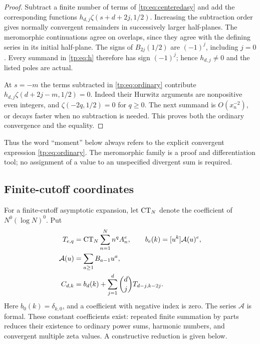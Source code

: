 \begin{proof}
Subtract a finite number of terms of \eqref{tp:eq:centeredasy} and add
the corresponding functions $h_{d,j}\zeta(s+d+2j,1/2)$.  Increasing
the subtraction order gives normally convergent remainders in
successively larger half-planes.  The meromorphic continuations agree
on overlaps, since they agree with the defining series in its initial
half-plane.  The signs of $B_{2j}(1/2)$ are $(-1)^j$, including $j=0$.
Every summand in \eqref{tp:eq:h} therefore has sign $(-1)^j$; hence
$h_{d,j}\ne0$ and the listed poles are actual.

At $s=-m$ the terms subtracted in \eqref{tp:eq:ordinary} contribute
$h_{d,j}\zeta(d+2j-m,1/2)=0$.  Indeed their Hurwitz arguments are
nonpositive even integers, and $\zeta(-2q,1/2)=0$ for $q\geq0$.
The next summand is $O(x_n^{-2})$, or decays faster when no subtraction
is needed.  This proves both the ordinary convergence and the equality.
\end{proof}

Thus the word ``moment'' below always refers to the explicit convergent
expression \eqref{tp:eq:ordinary}.  The meromorphic family is a proof
and differentiation tool; no assignment of a value to an unspecified
divergent sum is required.

\subsection{Finite-cutoff coordinates}

For a finite-cutoff asymptotic expansion, let $\operatorname{CT}_N$ denote the coefficient
of $N^0(\log N)^0$.  Put
\begin{equation}\label{tp:eq:TC}
 \begin{split}
 T_{e,q}&=\operatorname{CT}_N\sum_{n=1}^N n^q A_n^e,\qquad
 b_e(k)=[u^k]\mathcal A(u)^e,\\
 \mathcal A(u)&=\sum_{a\geq1}B_{a-1}u^a,\\
 C_{d,k}&=b_d(k)+\sum_{j=1}^d\binom dj T_{d-j,k-2j}.
 \end{split}
\end{equation}
Here $b_0(k)=\delta_{k,0}$, and a coefficient with negative index is
zero.  The series $\mathcal A$ is formal.  These constant coefficients
exist: repeated finite summation by parts reduces their existence to
ordinary power sums, harmonic numbers, and convergent multiple zeta
values.  A constructive reduction is given below.

